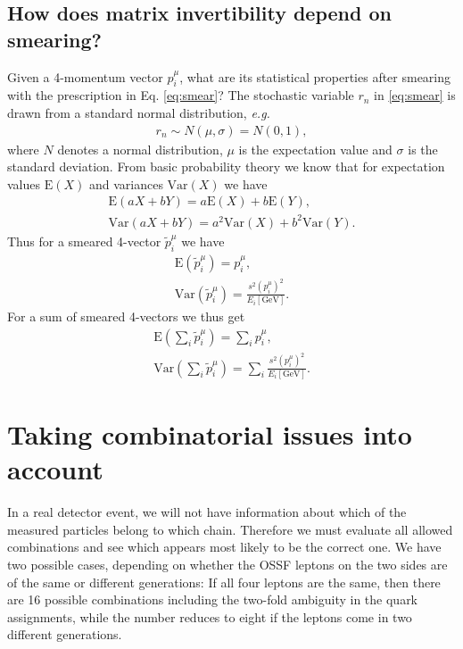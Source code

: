 \documentclass[twoside,english]{uiofysmaster}
\begin{document}
\subsection{How does matrix invertibility depend on smearing?}
Given a 4-momentum vector $p^\mu_i$, what are its statistical properties after smearing with the prescription in Eq. \eqref{eq:smear}? The stochastic variable $r_n$ in \eqref{eq:smear} is drawn from a standard normal distribution, {\it e.g.}\
\begin{align}
	r_n \sim N(\mu,\sigma) = N(0,1),
\end{align}
where $N$ denotes a normal distribution, $\mu$ is the expectation value and $\sigma$ is the standard deviation. From basic probability theory we know that for expectation values $\mathrm E(X)$ and variances $\mathrm{Var}(X)$ we have
\begin{align}
	\mathrm E(aX+bY) = a\mathrm E(X) + b\mathrm E(Y),\\
	\mathrm{Var}(aX + bY) = a^2\mathrm{Var}(X) + b^2\mathrm{Var}(Y).\nonumber
\end{align}
Thus for a smeared 4-vector $\tilde{p}^\mu_i$ we have
\begin{align}
	\mathrm E(\tilde{p}^\mu_i) = p^\mu_i,\\
	\mathrm{Var}(\tilde{p}^\mu_i) = \frac{s^2 (p^\mu_i)^2}{E_i\mathrm{[GeV]}}.
\end{align}
For a sum of smeared 4-vectors we thus get
\begin{align}
		\mathrm E\left(\sum_i \tilde{p}^\mu_i\right) = \sum_i p^\mu_i,\\
	\mathrm{Var}\left(\sum_i \tilde{p}^\mu_i\right) = \sum_i \frac{s^2 (p^\mu_i)^2}{E_i\mathrm{[GeV]}}.
\end{align}




\section{Taking combinatorial issues into account}
In a real detector event, we will not have information about which of the measured particles belong to which chain. Therefore we must evaluate all allowed combinations and see which appears most likely to be the correct one. We have two possible cases, depending on whether the OSSF leptons on the two sides are of the same or different generations: If all four leptons are the same, then there are 16 possible combinations including the two-fold ambiguity in the quark assignments, while the number reduces to eight if the leptons come in two different generations. 
\end{document}
